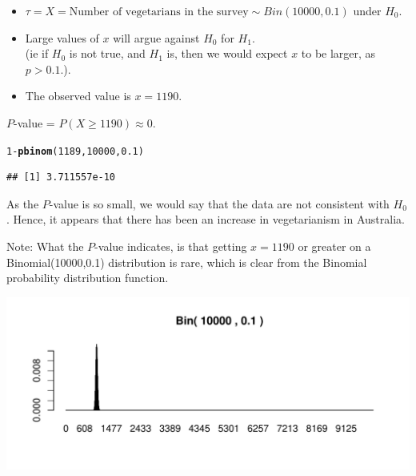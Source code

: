\documentclass[t,xcolor=pdftex,dvipsnames,table]{beamer}\usepackage[]{graphicx}\usepackage[]{color}
\makeatletter
\def\maxwidth{ %
  \ifdim\Gin@nat@width>\linewidth
    \linewidth
  \else
    \Gin@nat@width
  \fi
}
\newcommand{\hlnum}[1]{\textcolor[rgb]{0.686,0.059,0.569}{#1}}%
\newcommand{\hlopt}[1]{\textcolor[rgb]{0,0,0}{#1}}%
\newcommand{\hlstd}[1]{\textcolor[rgb]{0.345,0.345,0.345}{#1}}%
\newcommand{\hlkwd}[1]{\textcolor[rgb]{0.737,0.353,0.396}{\textbf{#1}}}%
\newenvironment{kframe}{%
 \def\at@end@of@kframe{}%
 \ifinner\ifhmode%
  \def\at@end@of@kframe{\end{minipage}}%
  \begin{minipage}{\columnwidth}%
 \fi\fi%
 \def\FrameCommand##1{\hskip\@totalleftmargin \hskip-\fboxsep
 \colorbox{shadecolor}{##1}\hskip-\fboxsep
     \hskip-\linewidth \hskip-\@totalleftmargin \hskip\columnwidth}%
 \MakeFramed {\advance\hsize-\width
   \@totalleftmargin\z@ \linewidth\hsize
   \@setminipage}}%
 {\par\unskip\endMakeFramed%
 \at@end@of@kframe}
\newenvironment{knitrout}{}{} %
\makeatother
\begin{document}
\begin{frame}[fragile]{}

\begin{itemize}
\item $\tau = X =  \mbox{Number of vegetarians in the survey} \sim Bin(10000,0.1)$ under $H_{0}$. 
\item Large values of $x$ will argue against $H_{0}$ for $H_{1}$. \\
(ie if $H_{0}$ is not true, and $H_{1}$ is, then we would expect $x$ to be larger, as $p > 0.1$.).
\item The observed value is $x=1190$.
\end{itemize}

\vspace{.5cm}
 $P$-value = $P( X \geq 1190) \approx 0$.

\begin{knitrout}
\color{fgcolor}\begin{kframe}
\begin{alltt}
\hlnum{1}\hlopt{-}\hlkwd{pbinom}\hlstd{(}\hlnum{1189}\hlstd{,}\hlnum{10000}\hlstd{,}\hlnum{0.1}\hlstd{)}
\end{alltt}
\begin{verbatim}
## [1] 3.711557e-10
\end{verbatim}
\end{kframe}
\end{knitrout}
\end{frame}

\begin{frame}[fragile]{}

As the $P$-value is so small, we would say that the data are not consistent with $H_{0}$. Hence, it appears that there has been an increase in vegetarianism in Australia.

\vspace{.5cm}
Note: What the $P$-value indicates, is that getting $x=1190$ or greater on a Binomial(10000,0.1) distribution is rare, which is clear from the Binomial probability distribution function.

\begin{knitrout}
\color{fgcolor}
\includegraphics[width=\maxwidth]{figure/unnamed-chunk-128-1} 

\end{knitrout}
\end{frame}
\end{document}
